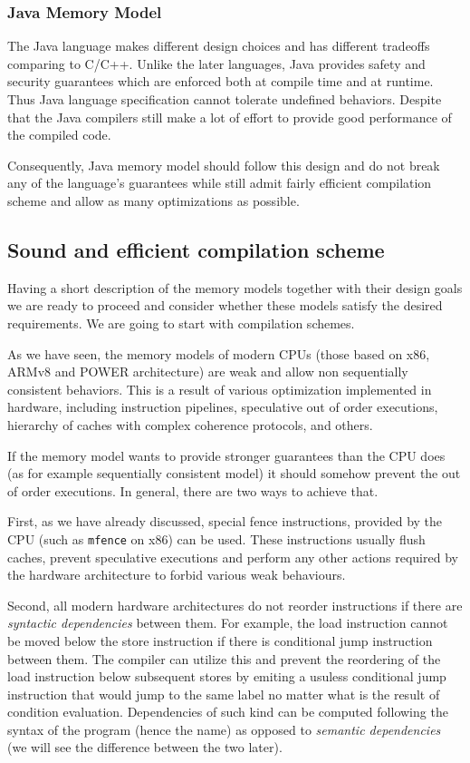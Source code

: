 \documentclass[a4paper,twoside,11pt]{article}
\numberwithin{equation}{section}
\begin{document}
\subsubsection{Java Memory Model}

The Java language makes different design choices and has different tradeoffs comparing to C/C++.
Unlike the later languages, Java provides safety and security guarantees
which are enforced both at compile time and at runtime.  
Thus Java language specification cannot tolerate undefined behaviors.
Despite that the Java compilers still make a lot of effort 
to provide good performance of the compiled code.

Consequently, Java memory model should follow this design 
and do not break any of the language's guarantees
while still admit fairly efficient compilation scheme
and allow as many optimizations as possible.

\subsection{Sound and efficient compilation scheme}

Having a short description of the memory models 
together with their design goals we are ready to proceed 
and consider whether these models satisfy the desired requirements.
We are going to start with compilation schemes.

As we have seen, the memory models of modern CPUs 
(those based on x86, ARMv8 and POWER architecture)
are weak and allow non sequentially consistent behaviors.
This is a result of various optimization implemented in hardware,
including instruction pipelines, speculative out of order executions, 
hierarchy of caches with complex coherence protocols, and others.

If the memory model wants to provide stronger guarantees 
than the CPU does (as for example sequentially consistent model)
it should somehow prevent the out of order executions.
In general, there are two ways to achieve that. 

First, as we have already discussed, special fence instructions,
provided by the CPU (such as \texttt{mfence} on x86) can be used.
These instructions usually flush caches, prevent speculative executions
and perform any other actions required by the hardware architecture
to forbid various weak behaviours.

Second, all modern hardware architectures do not reorder instructions 
if there are \emph{syntactic dependencies} between them. 
For example, the load instruction cannot be moved below 
the store instruction if there is conditional jump instruction between them.
The compiler can utilize this and prevent 
the reordering of the load instruction below subsequent stores
by emiting a usuless conditional jump instruction that would jump 
to the same label no matter what is the result of condition evaluation.
Dependencies of such kind can be computed following the 
syntax of the program (hence the name) as opposed 
to \emph{semantic dependencies} 
(we will see the difference between the two later).
\end{document}
